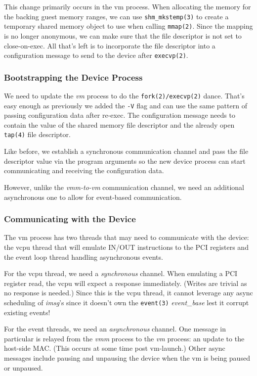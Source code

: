 \documentclass[conference]{IEEEtran}
\begin{document}
This change primarily occurs in the vm process. When allocating the
memory for the backing guest memory ranges, we can use
\texttt{shm\_mkstemp(3)} to create a temporary shared memory object
to use when calling \texttt{mmap(2)}. Since the mapping is no longer
anonymous, we can make sure that the file descriptor is not set to
close-on-exec. All that's left is to incorporate the file descriptor
into a configuration message to send to the device after
\texttt{execvp(2)}.


\vspace{2mm}
\subsubsection{Bootstrapping the Device Process}
We need to update the \emph{vm} process to do the
\texttt{fork(2)/execvp(2)} dance. That's easy enough as previously we
added the \texttt{-V} flag and can use the same pattern of passing
configuration data after re-exec. The configuration message needs to
contain the value of the shared memory file descriptor and the already
open \texttt{tap(4)} file descriptor.

Like before, we establish a synchronous communication channel and pass
the file descriptor value via the program arguments so the new device
process can start communicating and receiving the configuration data.

However, unlike the \emph{vmm-to-vm} communication channel, we need an
additional asynchronous one to allow for event-based communication.


\vspace{2mm}
\subsubsection{Communicating with the Device}
The vm process has two threads that may need to communicate with the
device: the vcpu thread that will emulate IN/OUT instructions to the
PCI registers and the event loop thread handling asynchronous events.

For the vcpu thread, we need a \emph{synchronous} channel. When
emulating a PCI register read, the vcpu will expect a response
immediately. (Writes are trivial as no response is needed.) Since this
is the vcpu thread, it cannot leverage any async scheduling of
\emph{imsg}'s since it doesn't own the \texttt{event(3)}
\emph{event\_base} lest it corrupt existing events!

For the event threads, we need an \emph{asynchronous} channel. One
message in particular is relayed from the \emph{vmm} process to the
\emph{vm} process: an update to the host-side MAC. (This occurs at
some time post vm-launch.) Other async messages include pausing and
unpausing the device when the vm is being paused or unpaused.
\end{document}
